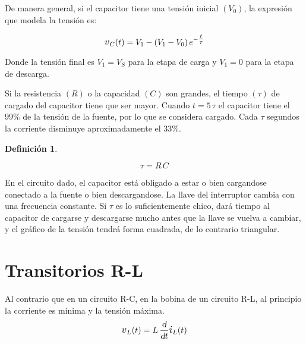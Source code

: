 \documentclass[a5paper,12pt,twoside]{book}
\newtheorem{defn}{{Definición}}[chapter]
\begin{document}
\begin{center}
    \def\svgwidth{0.8\linewidth}
    
\end{center}

De manera general, si el capacitor tiene una tensión inicial $(V_0)$, la expresión que modela la tensión es:

\begin{equation*}
    \voltage_C(t) = V_1 - \inParentheses{V_1 - V_0} e^{-\tfrac{t}{\tau}}
\end{equation*}

Donde la tensión final es $V_1 = V_S$ para la etapa de carga y $V_1 = 0$ para la etapa de descarga.

Si la resistencia $(R)$ o la capacidad $(C)$ son grandes, el tiempo $(\tau)$ de cargado del capacitor tiene que ser mayor.
Cuando $t = 5 \, \tau$ el capacitor tiene el $99\%$ de la tensión de la fuente, por lo que se considera cargado.
Cada $\tau$ segundos la corriente disminuye aproximadamente el $33\%$.

\begin{mdframed}[style=MyFrame1]
    \begin{defn}
    \end{defn}
    \begin{equation*}
        \tau = R \, C
    \end{equation*}
\end{mdframed}

En el circuito dado, el capacitor está obligado a estar o bien cargandose conectado a la fuente o bien descargandose.
La llave del interruptor cambia con una frecuencia constante.
Si $\tau$ es lo suficientemente chico, dará tiempo al capacitor de cargarse y descargarse mucho antes que la llave se vuelva a cambiar, y el gráfico de la tensión tendrá forma cuadrada, de lo contrario triangular.

\begin{center}
    \def\svgwidth{\linewidth}
    
\end{center}


\section{Transitorios R-L}

Al contrario que en un circuito R-C, en la bobina de un circuito R-L, al principio la corriente es mínima y la tensión máxima.
\begin{equation*}
    \voltage_L(t) = L \, \frac{\dif}{\dif t} \current_L(t)
\end{equation*}
\end{document}
